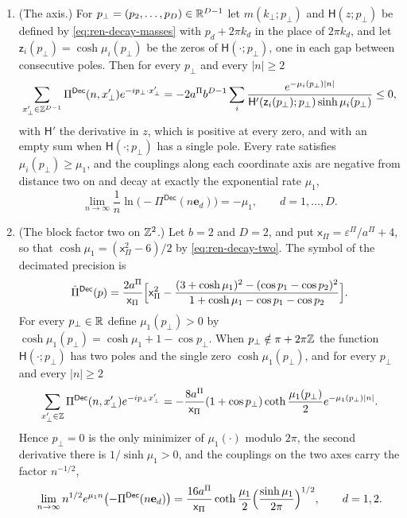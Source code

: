 \begin{proposition}
\begin{enumerate}
\item[(d)] (The axis.) For $p_\perp=(p_2,\dots,p_D)\in\mathbb{R}^{D-1}$ let $m(k_\perp;p_\perp)$ and $\mathsf H(z;p_\perp)$ be defined by \eqref{eq:ren-decay-masses} with $p_d+2\pi k_d$ in the place of $2\pi k_d$, and let $\mathsf z_i(p_\perp)=\cosh\mu_i(p_\perp)$ be the zeros of $\mathsf H(\cdot;p_\perp)$, one in each gap between consecutive poles. Then for every $p_\perp$ and every $\lvert n\rvert\ge2$
\begin{equation}\label{eq:ren-decay-partial}
\sum_{x'_\perp\in\mathbb{Z}^{D-1}}\Pi^{\mathsf{Dec}}(n,x'_\perp)e^{-ip_\perp\cdot x'_\perp}=-2a^\Pi b^{D-1}\sum_i\frac{e^{-\mu_i(p_\perp)\lvert n\rvert}}{\mathsf H'(\mathsf z_i(p_\perp);p_\perp)\sinh\mu_i(p_\perp)}\le0,
\end{equation}
with $\mathsf H'$ the derivative in $z$, which is positive at every zero, and with an empty sum when $\mathsf H(\cdot;p_\perp)$ has a single pole. Every rate satisfies $\mu_i(p_\perp)\ge\mu_1$, and the couplings along each coordinate axis are negative from distance two on and decay at exactly the exponential rate $\mu_1$,
\begin{equation}\label{eq:ren-decay-axis}
\lim_{n\to\infty}\frac1n\ln\bigl(-\Pi^{\mathsf{Dec}}(n\mathbf e_d)\bigr)=-\mu_1,\qquad d=1,\dots,D.
\end{equation}
\item[(e)] (The block factor two on $\mathbb{Z}^2$.) Let $b=2$ and $D=2$, and put $\mathsf x_\Pi=\varepsilon^\Pi/a^\Pi+4$, so that $\cosh\mu_1=(\mathsf x_\Pi^2-6)/2$ by \eqref{eq:ren-decay-two}. The symbol of the decimated precision is
\begin{equation}\label{eq:ren-decay-two-symbol}
\hat\Pi^{\mathsf{Dec}}(p)=\frac{2a^\Pi}{\mathsf x_\Pi}\Bigl[\mathsf x_\Pi^2-\frac{(3+\cosh\mu_1)^2-(\cos p_1-\cos p_2)^2}{1+\cosh\mu_1-\cos p_1-\cos p_2}\Bigr].
\end{equation}
For every $p_\perp\in\mathbb{R}$ define $\mu_1(p_\perp)>0$ by $\cosh\mu_1(p_\perp)=\cosh\mu_1+1-\cos p_\perp$. When $p_\perp\notin\pi+2\pi\mathbb{Z}$ the function $\mathsf H(\cdot;p_\perp)$ has two poles and the single zero $\cosh\mu_1(p_\perp)$, and for every $p_\perp$ and every $\lvert n\rvert\ge2$
\begin{equation}\label{eq:ren-decay-two-partial}
\sum_{x'_\perp\in\mathbb{Z}}\Pi^{\mathsf{Dec}}(n,x'_\perp)e^{-ip_\perp x'_\perp}=-\frac{8a^\Pi}{\mathsf x_\Pi}(1+\cos p_\perp)\coth\frac{\mu_1(p_\perp)}2e^{-\mu_1(p_\perp)\lvert n\rvert}.
\end{equation}
Hence $p_\perp=0$ is the only minimizer of $\mu_1(\cdot)$ modulo $2\pi$, the second derivative there is $1/\sinh\mu_1>0$, and the couplings on the two axes carry the factor $n^{-1/2}$,
\begin{equation}\label{eq:ren-decay-two-axis}
\lim_{n\to\infty}n^{1/2}e^{\mu_1n}\bigl(-\Pi^{\mathsf{Dec}}(n\mathbf e_d)\bigr)=\frac{16a^\Pi}{\mathsf x_\Pi}\coth\frac{\mu_1}2\Bigl(\frac{\sinh\mu_1}{2\pi}\Bigr)^{1/2},\qquad d=1,2.
\end{equation}
\end{enumerate}
\end{proposition}
